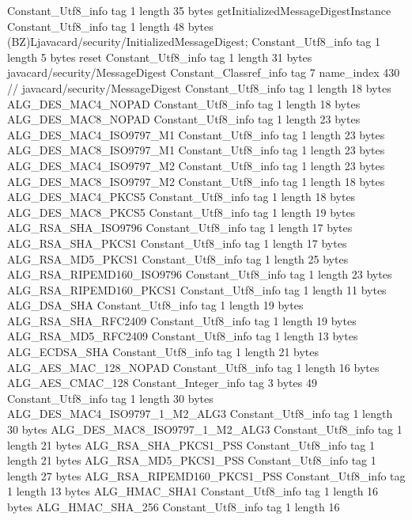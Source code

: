 {{{		}
		Constant_Utf8_info {
			tag	1
			length	35
			bytes	getInitializedMessageDigestInstance
		}
		Constant_Utf8_info {
			tag	1
			length	48
			bytes	(BZ)Ljavacard/security/InitializedMessageDigest;
		}
		Constant_Utf8_info {
			tag	1
			length	5
			bytes	reset
		}
		Constant_Utf8_info {
			tag	1
			length	31
			bytes	javacard/security/MessageDigest
		}
		Constant_Classref_info {
			tag	7
			name_index	430		// javacard/security/MessageDigest
		}
		Constant_Utf8_info {
			tag	1
			length	18
			bytes	ALG_DES_MAC4_NOPAD
		}
		Constant_Utf8_info {
			tag	1
			length	18
			bytes	ALG_DES_MAC8_NOPAD
		}
		Constant_Utf8_info {
			tag	1
			length	23
			bytes	ALG_DES_MAC4_ISO9797_M1
		}
		Constant_Utf8_info {
			tag	1
			length	23
			bytes	ALG_DES_MAC8_ISO9797_M1
		}
		Constant_Utf8_info {
			tag	1
			length	23
			bytes	ALG_DES_MAC4_ISO9797_M2
		}
		Constant_Utf8_info {
			tag	1
			length	23
			bytes	ALG_DES_MAC8_ISO9797_M2
		}
		Constant_Utf8_info {
			tag	1
			length	18
			bytes	ALG_DES_MAC4_PKCS5
		}
		Constant_Utf8_info {
			tag	1
			length	18
			bytes	ALG_DES_MAC8_PKCS5
		}
		Constant_Utf8_info {
			tag	1
			length	19
			bytes	ALG_RSA_SHA_ISO9796
		}
		Constant_Utf8_info {
			tag	1
			length	17
			bytes	ALG_RSA_SHA_PKCS1
		}
		Constant_Utf8_info {
			tag	1
			length	17
			bytes	ALG_RSA_MD5_PKCS1
		}
		Constant_Utf8_info {
			tag	1
			length	25
			bytes	ALG_RSA_RIPEMD160_ISO9796
		}
		Constant_Utf8_info {
			tag	1
			length	23
			bytes	ALG_RSA_RIPEMD160_PKCS1
		}
		Constant_Utf8_info {
			tag	1
			length	11
			bytes	ALG_DSA_SHA
		}
		Constant_Utf8_info {
			tag	1
			length	19
			bytes	ALG_RSA_SHA_RFC2409
		}
		Constant_Utf8_info {
			tag	1
			length	19
			bytes	ALG_RSA_MD5_RFC2409
		}
		Constant_Utf8_info {
			tag	1
			length	13
			bytes	ALG_ECDSA_SHA
		}
		Constant_Utf8_info {
			tag	1
			length	21
			bytes	ALG_AES_MAC_128_NOPAD
		}
		Constant_Utf8_info {
			tag	1
			length	16
			bytes	ALG_AES_CMAC_128
		}
		Constant_Integer_info {
			tag	3
			bytes	49
		}
		Constant_Utf8_info {
			tag	1
			length	30
			bytes	ALG_DES_MAC4_ISO9797_1_M2_ALG3
		}
		Constant_Utf8_info {
			tag	1
			length	30
			bytes	ALG_DES_MAC8_ISO9797_1_M2_ALG3
		}
		Constant_Utf8_info {
			tag	1
			length	21
			bytes	ALG_RSA_SHA_PKCS1_PSS
		}
		Constant_Utf8_info {
			tag	1
			length	21
			bytes	ALG_RSA_MD5_PKCS1_PSS
		}
		Constant_Utf8_info {
			tag	1
			length	27
			bytes	ALG_RSA_RIPEMD160_PKCS1_PSS
		}
		Constant_Utf8_info {
			tag	1
			length	13
			bytes	ALG_HMAC_SHA1
		}
		Constant_Utf8_info {
			tag	1
			length	16
			bytes	ALG_HMAC_SHA_256
		}
		Constant_Utf8_info {
			tag	1
			length	16
}}}
